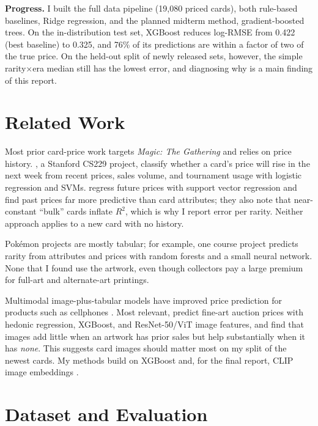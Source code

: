 \documentclass{article}
\begin{document}
\textbf{Progress.} I built the full data pipeline (19{,}080 priced cards), both rule-based baselines, Ridge regression, and the planned midterm method, gradient-boosted trees. On the in-distribution test set, XGBoost reduces log-RMSE from 0.422 (best baseline) to 0.325, and 76\% of its predictions are within a factor of two of the true price. On the held-out split of newly released sets, however, the simple rarity$\times$era median still has the lowest error, and diagnosing why is a main finding of this report.

\section{Related Work}

Most prior card-price work targets \emph{Magic: The Gathering} and relies on price history. \citet{pawlicki2014mtg}, a Stanford CS229 project, classify whether a card's price will rise in the next week from recent prices, sales volume, and tournament usage with logistic regression and SVMs. \citet{perkhounkov2015financial} regress future prices with support vector regression and find past prices far more predictive than card attributes; they also note that near-constant ``bulk'' cards inflate $R^2$, which is why I report error per rarity. Neither approach applies to a new card with no history.

Pok\'emon projects are mostly tabular; for example, one course project \citep{cse151a_pokemon} predicts rarity from attributes and prices with random forests and a small neural network. None that I found use the artwork, even though collectors pay a large premium for full-art and alternate-art printings.

Multimodal image-plus-tabular models have improved price prediction for products such as cellphones \citep{zehtab2020multimodal}. Most relevant, \citet{mei2025art} predict fine-art auction prices with hedonic regression, XGBoost, and ResNet-50/ViT image features, and find that images add little when an artwork has prior sales but help substantially when it has \emph{none}. This suggests card images should matter most on my split of the newest cards. My methods build on XGBoost \citep{chen2016xgboost} and, for the final report, CLIP image embeddings \citep{radford2021clip}.

\section{Dataset and Evaluation}
\end{document}
